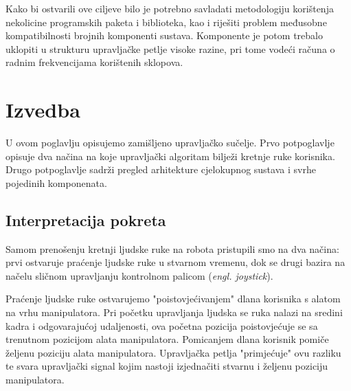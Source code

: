 \documentclass[times, utf8, diplomski, numeric]{fer}
\begin{document}
Kako bi ostvarili ove ciljeve bilo je potrebno savladati metodologiju korištenja nekolicine programskih paketa i biblioteka, kao i riješiti problem međusobne kompatibilnosti brojnih komponenti sustava.
Komponente je potom trebalo uklopiti u strukturu upravljačke petlje visoke razine, pri tome vodeći računa o radnim frekvencijama korištenih sklopova.

\chapter{Izvedba}
U ovom poglavlju opisujemo zamišljeno upravljačko sučelje. 
Prvo potpoglavlje opisuje dva načina na koje upravljački algoritam bilježi kretnje ruke korisnika.
Drugo potpoglavlje sadrži pregled arhitekture cjelokupnog sustava i svrhe pojedinih komponenata. 

\section{Interpretacija pokreta}\label{2_1}
Samom prenošenju kretnji ljudske ruke na robota pristupili smo na dva načina: prvi ostvaruje praćenje ljudske ruke u stvarnom vremenu, dok se drugi bazira na načelu sličnom upravljanju kontrolnom palicom (\textit{engl. joystick}).

Praćenje ljudske ruke ostvarujemo "poistovjećivanjem" dlana korisnika s alatom na vrhu manipulatora. 
Pri početku upravljanja ljudska se ruka nalazi na sredini kadra i odgovarajućoj udaljenosti, ova početna pozicija poistovjećuje se sa trenutnom pozicijom alata manipulatora.
Pomicanjem dlana korisnik pomiče željenu poziciju alata manipulatora.
Upravljačka petlja "primjećuje" ovu razliku te svara upravljački signal kojim nastoji izjednačiti stvarnu i željenu poziciju manipulatora.
\end{document}
